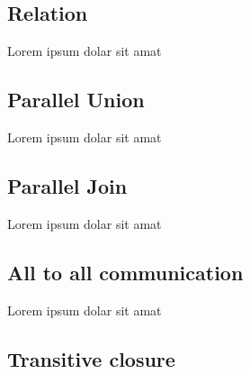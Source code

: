 \subsection{Relation}
\label{sec:relation}
Lorem ipsum dolar sit amat


\subsection{Parallel Union}
\label{sec:union}
Lorem ipsum dolar sit amat


\subsection{Parallel Join}
\label{sec:join}
Lorem ipsum dolar sit amat


\subsection{All to all communication}
\label{sec:ata}
Lorem ipsum dolar sit amat


\subsection{Transitive closure}
\label{sec:tc}

